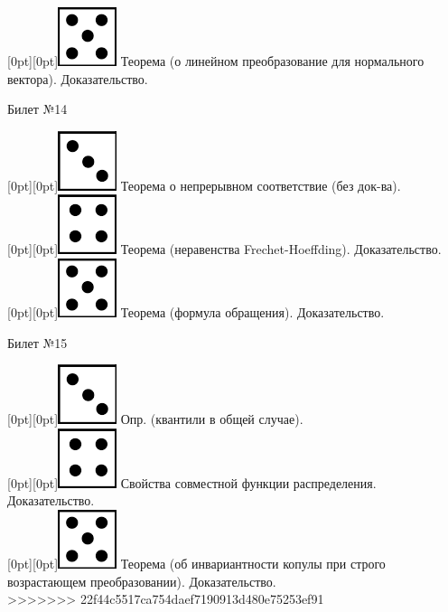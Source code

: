 \documentclass[10pt]{article}
\begin{document}
\raisebox{-1pt}[0pt][0pt]{\includegraphics[width=0.02\linewidth]{5.png}} Теорема (о линейном преобразование для нормального вектора). Доказательство. \\

\begin{center} {\Large Билет №14} \end{center} 

\raisebox{-1pt}[0pt][0pt]{\includegraphics[width=0.02\linewidth]{3.png}} Теорема о непрерывном соответствие (без док-ва). \\

\raisebox{-1pt}[0pt][0pt]{\includegraphics[width=0.02\linewidth]{4.png}} Теорема (неравенства Frechet-Hoeffding). Доказательство. \\

\raisebox{-1pt}[0pt][0pt]{\includegraphics[width=0.02\linewidth]{5.png}} Теорема (формула обращения). Доказательство. \\

\begin{center} {\Large Билет №15} \end{center} 

\raisebox{-1pt}[0pt][0pt]{\includegraphics[width=0.02\linewidth]{3.png}}   Опр. (квантили в общей случае). \\

\raisebox{-1pt}[0pt][0pt]{\includegraphics[width=0.02\linewidth]{4.png}} Свойства совместной функции распределения. Доказательство. \\

\raisebox{-1pt}[0pt][0pt]{\includegraphics[width=0.02\linewidth]{5.png}} Теорема (об инвариантности копулы при строго возрастающем преобразовании). Доказательство. \\
>>>>>>> 22f44c5517ca754daef7190913d480e75253ef91
\end{document}
